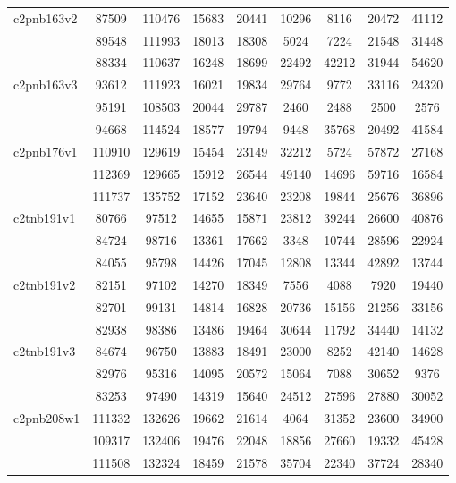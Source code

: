 \documentclass[a4paper]{article}
\begin{document}
\begin{center}
\begin{longtable}{ |l|c|c|c|c|c|c|c|c| }
c2pnb163v2 & 87509 & 110476 & 15683 & 20441 & 10296 & 8116 & 20472 & 41112 \\
& 89548 & 111993 & 18013 & 18308 & 5024 & 7224 & 21548 & 31448 \\
& 88334 & 110637 & 16248 & 18699 & 22492 & 42212 & 31944 & 54620 \\ \hline

c2pnb163v3 & 93612 & 111923 & 16021 & 19834 & 29764 & 9772 & 33116 & 24320 \\ 
& 95191 & 108503 & 20044 & 29787 & 2460 & 2488 & 2500 & 2576 \\ 
& 94668 & 114524 & 18577 & 19794 & 9448 & 35768 & 20492 & 41584 \\ \hline

c2pnb176v1 & 110910 & 129619 & 15454 & 23149 & 32212 & 5724 & 57872 & 27168 \\ 
& 112369 & 129665 & 15912 & 26544 & 49140 & 14696 & 59716 & 16584 \\
& 111737 & 135752 & 17152 & 23640 & 23208 & 19844 & 25676 & 36896 \\ \hline

c2tnb191v1 & 80766 & 97512 & 14655 & 15871 & 23812 & 39244 & 26600 & 40876 \\ 
& 84724 & 98716 & 13361 & 17662 & 3348 & 10744 & 28596 & 22924 \\ 
& 84055 & 95798 & 14426 & 17045 & 12808 & 13344 & 42892 & 13744 \\ \hline

c2tnb191v2 & 82151 & 97102 & 14270 & 18349 & 7556 & 4088 & 7920 & 19440 \\ 
& 82701 & 99131 & 14814 & 16828 & 20736 & 15156 & 21256 & 33156 \\
& 82938 & 98386 & 13486 & 19464 & 30644 & 11792 & 34440 & 14132 \\ \hline

c2tnb191v3 & 84674 & 96750 & 13883 & 18491 & 23000 & 8252 & 42140 & 14628 \\
& 82976 & 95316 & 14095 & 20572 & 15064 & 7088 & 30652 & 9376 \\
& 83253 & 97490 & 14319 & 15640 & 24512 & 27596 & 27880 & 30052 \\ \hline

c2pnb208w1 & 111332 & 132626 & 19662 & 21614 & 4064 & 31352 & 23600 & 34900 \\ 
& 109317 & 132406 & 19476 & 22048 & 18856 & 27660 & 19332 & 45428 \\ 
& 111508 & 132324 & 18459 & 21578 & 35704 & 22340 & 37724 & 28340 \\ \hline


\end{longtable}
\end{center}
\end{document}
